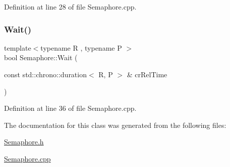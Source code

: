 Definition at line 28 of file Semaphore.\+cpp.

\mbox{\label{class_semaphore_a7f700173ae86ae623684109066e07656}} 
\subsubsection{\texorpdfstring{Wait()}{Wait()}\hspace{0.1cm}{\footnotesize\ttfamily [2/2]}}
{\footnotesize\ttfamily template$<$typename R , typename P $>$ \\
bool Semaphore\+::\+Wait (\begin{DoxyParamCaption}\item[{const std\+::chrono\+::duration$<$ R, P $>$ \&}]{cr\+Rel\+Time }\end{DoxyParamCaption})}



Definition at line 36 of file Semaphore.\+cpp.



The documentation for this class was generated from the following files\+:\begin{DoxyCompactItemize}
\item 
\hyperlink{_semaphore_8h}{Semaphore.\+h}\item 
\hyperlink{_semaphore_8cpp}{Semaphore.\+cpp}\end{DoxyCompactItemize}
